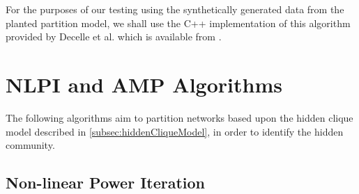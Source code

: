 For the purposes of our testing using the synthetically generated data from the planted partition model, we shall use the C++ implementation of this algorithm provided by Decelle et al. \cite{DKM+13} which is available from \cite{ModeNet}.


\section{NLPI and AMP Algorithms}
\label{sec:NLPIAndAMPAlgorithmsCommunityDetection}

The following algorithms aim to partition networks based upon the hidden clique model described in \cref{subsec:hiddenCliqueModel}, in order to identify the hidden community.


\subsection{Non-linear Power Iteration}
\label{subsec:nonLinearPowerIteration}

